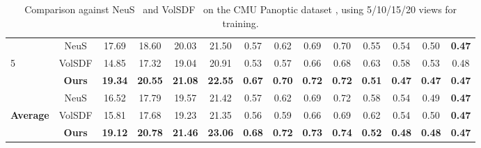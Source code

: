 \begin{table*}[h!]
\begin{center}
{\begin{tabular}{l|c|cccc|cccc|cccc}
\cline{0-13}
 & NeuS &17.69& 18.60&20.03 &21.50&0.57 &0.62&0.69&0.70&0.55&0.54&0.50& \textcolor{textcolor}{\textbf{0.47}}\\
5& VolSDF &14.85& 17.32&19.04 &20.91&0.53&0.57&0.66&0.68&0.63&0.58&0.53&0.48\\
 &\textbf{Ours}&\textcolor{textcolor}{\textbf{19.34}}&\textcolor{textcolor}{\textbf{20.55}} &\textcolor{textcolor}{\textbf{21.08}}&\textcolor{textcolor}{\textbf{22.55}}&\textcolor{textcolor}{\textbf{0.67}} &\textcolor{textcolor}{\textbf{0.70}}&\textcolor{textcolor}{\textbf{0.72}}&\textcolor{textcolor}{\textbf{0.72}}&\textcolor{textcolor}{\textbf{0.51}} &\textcolor{textcolor}{\textbf{0.47}}&\textcolor{textcolor}{\textbf{0.47}}&\textcolor{textcolor}{\textbf{0.47}}\\
 \cline{0-13}
 & NeuS &16.52&17.79 &19.57 &21.42&0.57&0.62 &0.69	&0.72 &0.58	&0.54 &	0.49 &	\textcolor{textcolor}{\textbf{0.47}} \\
\textbf{Average}& 
VolSDF &15.81&17.68 &19.23&21.35 &0.56&0.59&	0.66 &	0.69 &0.62&	0.54	&0.50 &\textcolor{textcolor}{\textbf{0.47}}\\
 &\textbf{Ours}&\textcolor{textcolor}{\textbf{19.12}}&\textcolor{textcolor}{\textbf{20.78}} &\textcolor{textcolor}{\textbf{21.46}}&\textcolor{textcolor}{\textbf{23.06}}&\textcolor{textcolor}{\textbf{0.68}} &\textcolor{textcolor}{\textbf{0.72}}&\textcolor{textcolor}{\textbf{0.73}}&\textcolor{textcolor}{\textbf{0.74}}&\textcolor{textcolor}{\textbf{0.52}}
 &\textcolor{textcolor}{\textbf{0.48}}&\textcolor{textcolor}{\textbf{0.48}}&\textcolor{textcolor}{\textbf{0.47}}\\
\bottomrule[1.2pt]
\end{tabular}}
\caption{Comparison against NeuS~\cite{wang2021neus} and VolSDF~\cite{yariv2021volume} on the CMU Panoptic dataset \cite{Simon_2017_CVPR,Joo_2017_TPAMI}, using 5/10/15/20 views for training.}%
\label{tab:realhuman}
\end{center}
\vspace{-8mm}
\end{table*}


